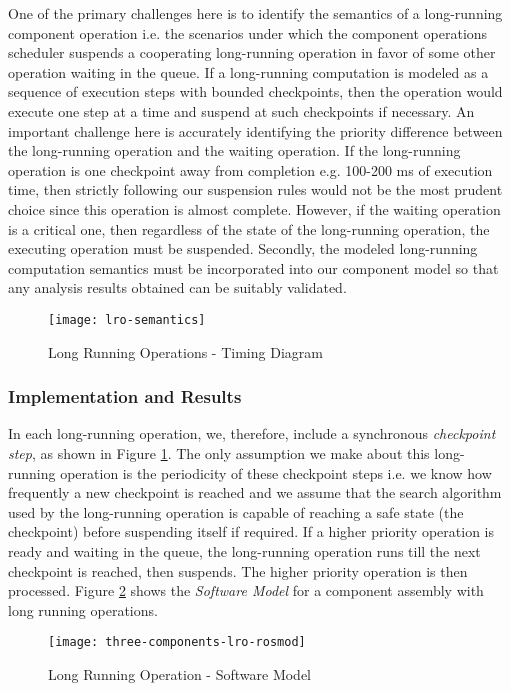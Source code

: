 One of the primary challenges here is to identify the semantics of a long-running component operation i.e. the scenarios under which the component operations scheduler suspends a cooperating long-running operation in favor of some other operation waiting in the queue. If a long-running computation is modeled as a sequence of execution steps with bounded checkpoints, then the operation would execute one step at a time and suspend at such checkpoints if necessary. An important challenge here is accurately identifying the priority difference between the long-running operation and the waiting operation. If the long-running operation is one checkpoint away from completion e.g. 100-200 ms of execution time, then strictly following our suspension rules would not be the most prudent choice since this operation is almost complete. However, if the waiting operation is a critical one, then regardless of the state of the long-running operation, the executing operation must be suspended. Secondly, the modeled long-running computation semantics must be incorporated into our component model so that any analysis results obtained can be suitably validated. 

\begin{figure}[h]
	\centering
	\texttt{[image: lro-semantics]}
	\caption{Long Running Operations - Timing Diagram}
	\label{fig:lro-semantics}
\end{figure}
\FloatBarrier

\subsubsection{Implementation and Results}

In each long-running operation, we, therefore, include a synchronous \emph{checkpoint step}, as shown in Figure \ref{fig:lro-semantics}. The only assumption we make about this long-running operation is the periodicity of these checkpoint steps i.e. we know how frequently a new checkpoint is reached and we assume that the search algorithm used by the long-running operation is capable of reaching a safe state (the checkpoint) before suspending itself if required. If a higher priority operation is ready and waiting in the queue, the long-running operation runs till the next checkpoint is reached, then suspends. The higher priority operation is then processed. Figure \ref{fig:three-components-lro-rosmod} shows the \emph{Software Model} for a component assembly with long running operations.

\begin{figure}[h]
	\centering
	\texttt{[image: three-components-lro-rosmod]}
	\caption{Long Running Operation - Software Model}
	\label{fig:three-components-lro-rosmod}
\end{figure}
\FloatBarrier

